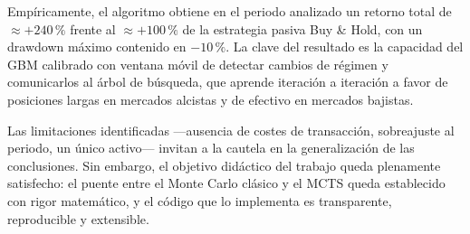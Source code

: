 Empíricamente, el algoritmo obtiene en el periodo analizado un retorno total de $\approx +240\,\%$ frente al $\approx +100\,\%$ de la estrategia pasiva Buy \& Hold, con un drawdown máximo contenido en $-10\,\%$. La clave del resultado es la capacidad del GBM calibrado con ventana móvil de detectar cambios de régimen y comunicarlos al árbol de búsqueda, que aprende iteración a iteración a favor de posiciones largas en mercados alcistas y de efectivo en mercados bajistas.

Las limitaciones identificadas ---ausencia de costes de transacción, sobreajuste al periodo, un único activo--- invitan a la cautela en la generalización de las conclusiones. Sin embargo, el objetivo didáctico del trabajo queda plenamente satisfecho: el puente entre el Monte Carlo clásico y el MCTS queda establecido con rigor matemático, y el código que lo implementa es transparente, reproducible y extensible.

